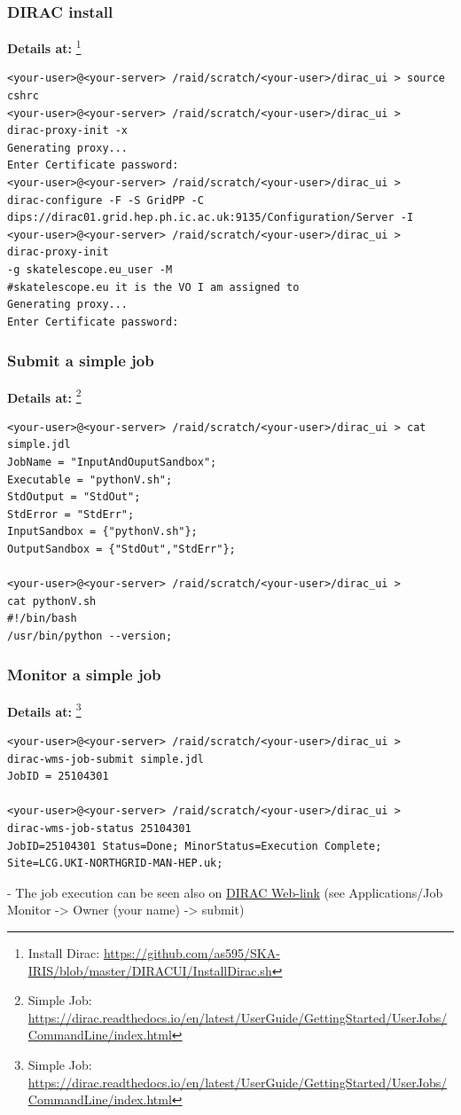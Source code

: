 \documentclass{beamer}
\begin{document}
\begin{frame}[fragile]
\frametitle{ DIRAC install}
\textbf{Details at:} \footnote {Install Dirac: \url{https://github.com/as595/SKA-IRIS/blob/master/DIRACUI/InstallDirac.sh}}
\begin{verbatim}
<your-user>@<your-server> /raid/scratch/<your-user>/dirac_ui > source 
cshrc
<your-user>@<your-server> /raid/scratch/<your-user>/dirac_ui > 
dirac-proxy-init -x
Generating proxy...
Enter Certificate password:
<your-user>@<your-server> /raid/scratch/<your-user>/dirac_ui > 
dirac-configure -F -S GridPP -C
dips://dirac01.grid.hep.ph.ic.ac.uk:9135/Configuration/Server -I
<your-user>@<your-server> /raid/scratch/<your-user>/dirac_ui > 
dirac-proxy-init
-g skatelescope.eu_user -M 
#skatelescope.eu it is the VO I am assigned to
Generating proxy...
Enter Certificate password:
\end{verbatim}
\end{frame}


\begin{frame}[fragile]
\frametitle{ Submit a simple job}
\textbf{Details at:} \footnote {Simple Job: \url{https://dirac.readthedocs.io/en/latest/UserGuide/GettingStarted/UserJobs/CommandLine/index.html}}
\begin{verbatim}
<your-user>@<your-server> /raid/scratch/<your-user>/dirac_ui > cat
simple.jdl
JobName = "InputAndOuputSandbox";
Executable = "pythonV.sh";
StdOutput = "StdOut";
StdError = "StdErr";
InputSandbox = {"pythonV.sh"};
OutputSandbox = {"StdOut","StdErr"};

<your-user>@<your-server> /raid/scratch/<your-user>/dirac_ui > 
cat pythonV.sh
#!/bin/bash
/usr/bin/python --version;

\end{verbatim}
\end{frame}


\begin{frame}[fragile]
\frametitle{ Monitor a simple job}
\textbf{Details at:} \footnote {Simple Job: \url{https://dirac.readthedocs.io/en/latest/UserGuide/GettingStarted/UserJobs/CommandLine/index.html}}
\begin{verbatim}
<your-user>@<your-server> /raid/scratch/<your-user>/dirac_ui > 
dirac-wms-job-submit simple.jdl
JobID = 25104301

<your-user>@<your-server> /raid/scratch/<your-user>/dirac_ui > 
dirac-wms-job-status 25104301
JobID=25104301 Status=Done; MinorStatus=Execution Complete;
Site=LCG.UKI-NORTHGRID-MAN-HEP.uk;
\end{verbatim}
- The job execution can be seen also on
\href{https://dirac.gridpp.ac.uk:8443/DIRAC/}{DIRAC Web-link}
(see Applications/Job Monitor -> Owner (your name) -> submit)
\end{frame}
\end{document}
